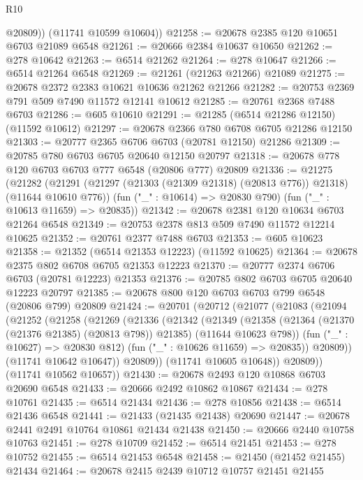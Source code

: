 \begin{lexlean}{R10}
\begin{coremodule}
          @20809))
      (@11741 @10599 @10604))
@21258 := @20678 @2385 @120 @10651 @6703 @21089 @6548
@21261 := @20666 @2384 @10637 @10650
@21262 := @278 @10642
@21263 := @6514 @21262
@21264 := @278 @10647
@21266 := @6514 @21264 @6548
@21269 := @21261 (@21263 @21266) @21089
@21275 := @20678 @2372 @2383 @10621 @10636 @21262 @21266
@21282 := @20753 @2369 @791 @509 @7490 @11572 @12141 @10612
@21285 := @20761 @2368 @7488 @6703
@21286 := @605 @10610
@21291 := @21285 (@6514 @21286 @12150) (@11592 @10612)
@21297 := @20678 @2366 @780 @6708 @6705 @21286 @12150
@21303 := @20777 @2365 @6706 @6703 (@20781 @12150) @21286
@21309 := @20785 @780 @6703 @6705 @20640 @12150 @20797
@21318 := @20678 @778 @120 @6703 @6703 @777 @6548 (@20806 @777) @20809
@21336 := @21275
    (@21282
      (@21291 (@21297 (@21303 (@21309 @21318) (@20813 @776)) @21318) (@11644 @10610 @776))
      (fun ("_" : @10614) => @20830 @790)
      (fun ("_" : @10613 @11659) => @20835))
@21342 := @20678 @2381 @120 @10634 @6703 @21264 @6548
@21349 := @20753 @2378 @813 @509 @7490 @11572 @12214 @10625
@21352 := @20761 @2377 @7488 @6703
@21353 := @605 @10623
@21358 := @21352 (@6514 @21353 @12223) (@11592 @10625)
@21364 := @20678 @2375 @802 @6708 @6705 @21353 @12223
@21370 := @20777 @2374 @6706 @6703 (@20781 @12223) @21353
@21376 := @20785 @802 @6703 @6705 @20640 @12223 @20797
@21385 := @20678 @800 @120 @6703 @6703 @799 @6548 (@20806 @799) @20809
@21424 := @20701
    (@20712
      (@21077
        (@21083
          (@21094
            (@21252
              (@21258
                (@21269
                  (@21336
                    (@21342
                      (@21349
                        (@21358
                          (@21364 (@21370 (@21376 @21385) (@20813 @798)) @21385)
                          (@11644 @10623 @798))
                        (fun ("_" : @10627) => @20830 @812)
                        (fun ("_" : @10626 @11659) => @20835))
                      @20809))
                  (@11741 @10642 @10647))
                @20809))
            (@11741 @10605 @10648))
          @20809))
      (@11741 @10562 @10657))
@21430 := @20678 @2493 @120 @10868 @6703 @20690 @6548
@21433 := @20666 @2492 @10862 @10867
@21434 := @278 @10761
@21435 := @6514 @21434
@21436 := @278 @10856
@21438 := @6514 @21436 @6548
@21441 := @21433 (@21435 @21438) @20690
@21447 := @20678 @2441 @2491 @10764 @10861 @21434 @21438
@21450 := @20666 @2440 @10758 @10763
@21451 := @278 @10709
@21452 := @6514 @21451
@21453 := @278 @10752
@21455 := @6514 @21453 @6548
@21458 := @21450 (@21452 @21455) @21434
@21464 := @20678 @2415 @2439 @10712 @10757 @21451 @21455

\end{coremodule}
\end{lexlean}

